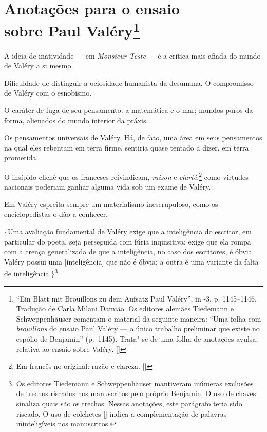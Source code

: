 
\chapter[Anotações para o ensaio sobre Paul Valéry \medskip]{Anotações para o ensaio\\ sobre Paul Valéry\footnote[*]{``Ein Blatt mit Brouillons zu dem Aufsatz Paul Valéry'', in -3, p. 1145--1146. Tradução de Carla Milani Damião. Os
  editores alemães Tiedemann e Schweppenhäuser comentam o material da
  seguinte maneira: ``Uma folha com \emph{brouillons} do ensaio Paul
  Valéry --- o único trabalho preliminar que existe no espólio de
  Benjamin'' (p.~1145). Trata"-se de uma folha de anotações avulsa, relativa ao ensaio sobre Valéry. []}}

A ideia de inatividade --- em \emph{Monsieur Teste} --- é a crítica mais afiada do
mundo de Valéry a si mesmo.

Dificuldade de distinguir a ociosidade humanista da desumana. O
compromisso de Valéry com o esnobismo.

O caráter de fuga de seu pensamento: a matemática e o mar; mundos puros
da forma, alienados do mundo interior da práxis.

Os pensamentos universais de Valéry. Há, de fato, uma área em seus
pensamentos na qual eles rebentam em terra firme, sentiria quase tentado
a dizer, em terra prometida.

O insípido clichê que os franceses reivindicam, \emph{raison} e
\emph{clarté},\footnote{Em francês no original: razão e clareza. []} como virtudes nacionais poderiam ganhar alguma vida
sob um exame de Valéry.

Em Valéry espreita sempre um materialismo inescrupuloso, como os
enciclopedistas o dão a conhecer.

\{Uma avaliação fundamental de Valéry exige que a inteligência do escritor,
em particular do poeta, seja perseguida com fúria inquisitiva; exige que
ela rompa com a crença generalizada de que a inteligência, no caso dos
escritores, é óbvia. Valéry possui uma {[}inteligência{]} que não é %
óbvia; a outra é uma variante da falta de inteligência.\}\footnote{Os editores Tiedemann e Schweppenhäuser mantiveram inúmeras
exclusões de trechos riscados nos manuscritos pelo próprio Benjamin. O uso de chaves {} sinaliza quais são os trechos. Nessas anotações, este parágrafo teria sido riscado. O uso de colchetes [] indica a complementação de palavras ininteligíveis nos manuscritos.}

